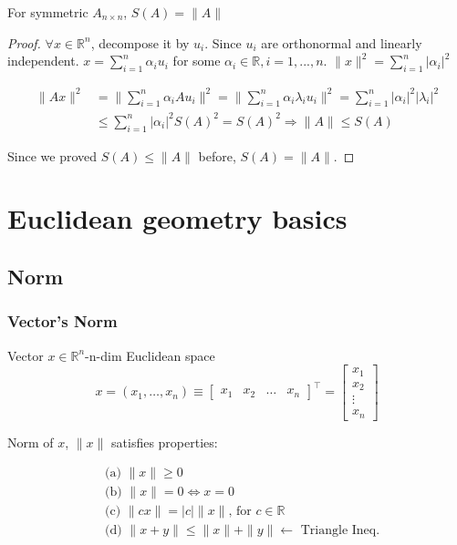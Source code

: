 \documentclass[11pt]{elegantbook}
\begin{document}
\begin{proposition}
    For symmetric $A_{n\times n}$, $S(A)= \|A\|$
\end{proposition}
\begin{proof}
\quad

$\forall x\in \mathbb{R}^n$, decompose it by $u_i$.
Since $u_i$ are orthonormal and linearly independent. $x=\sum_{i=1}^n\alpha_i u_i$ for some $\alpha_i\in \mathbb{R},i=1,...,n$. $\|x\|^2=\sum_{i=1}^n|\alpha_i|^2$

\begin{equation}
    \begin{aligned}
        \|Ax\|^2&=\|\sum_{i=1}^n\alpha_i A u_i\|^2=\|\sum_{i=1}^n\alpha_i \lambda_i u_i\|^2=\sum_{i=1}^n|\alpha_i|^2|\lambda_i|^2\\
        &\leq \sum_{i=1}^n|\alpha_i|^2S(A)^2=S(A)^2 \Rightarrow	\|A\|\leq S(A)
    \end{aligned}
    \nonumber
\end{equation}

Since we proved $S(A)\leq \|A\|$ before, $S(A)=\|A\|$.
\end{proof}









\chapter{Euclidean geometry basics}
\section{Norm}
\subsection{Vector's Norm}
Vector $x \in \mathbb{R}^{n}$-n-dim Euclidean space
$$
x=\left(x_{1}, \ldots, x_{n}\right) \equiv\left[\begin{array}{llll}
x_{1} & x_{2} & \ldots & x_{n}
\end{array}\right]^{\top}=\left[\begin{array}{c}
x_{1} \\
x_{2} \\
\vdots \\
x_{n}
\end{array}\right]
$$

Norm of $x$, $\|x\|$ satisfies properties:

$$
\begin{aligned}
&\text { (a) }\|x\| \geqslant 0 \\
&\text { (b) }\|x\|=0 \Leftrightarrow x=0 \\
&\text { (c) }\|c x\|=|c|\|x\| \text {, for } c \in \mathbb{R} \\
&\text { (d) }\|x+y\| \leqslant\|x\|+\|y\| \longleftarrow \text { Triangle Ineq. }
\end{aligned}
$$
\end{document}
